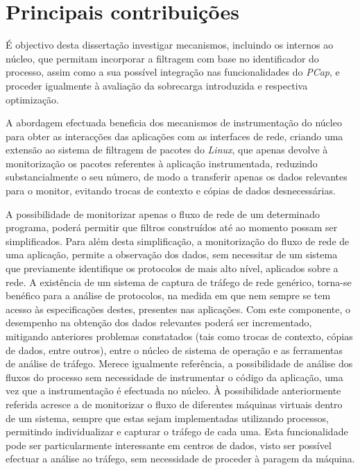 
\section{Principais contribuições} 
\label{sec:intro_contribuicoes}

É objectivo desta dissertação investigar mecanismos, incluindo os internos ao núcleo, que permitam incorporar a filtragem com base no identificador do processo, assim como a sua possível integração nas funcionalidades do \textit{PCap}, e proceder igualmente à avaliação da sobrecarga introduzida e respectiva optimização.

A abordagem efectuada beneficia dos mecanismos de instrumentação do núcleo para obter as interacções das aplicações com as interfaces de rede, criando uma extensão ao sistema de filtragem de pacotes do \textit{Linux}, que apenas devolve à monitorização os pacotes referentes à aplicação instrumentada, reduzindo substancialmente o seu número, de modo a transferir apenas os dados relevantes para o monitor, evitando trocas de contexto e cópias de dados desnecessárias.

A possibilidade de monitorizar apenas o fluxo de rede de um determinado programa, poderá permitir que filtros construídos até ao momento possam ser simplificados.
Para além desta simplificação, a monitorização do fluxo de rede de uma aplicação, permite a observação dos dados, sem necessitar de um sistema que previamente identifique os protocolos de mais alto nível, aplicados sobre a rede.
A existência de um sistema de captura de tráfego de rede genérico, torna-se benéfico para a análise de protocolos, na medida em que nem sempre se tem acesso às especificações destes, presentes nas aplicações.
Com este componente, o desempenho na obtenção dos dados relevantes poderá ser incrementado, mitigando anteriores problemas constatados (tais como trocas de contexto, cópias de dados, entre outros), entre o núcleo de sistema de operação e as ferramentas de análise de tráfego.
Merece igualmente referência, a possibilidade de análise dos fluxos do processo sem necessidade de instrumentar o código da aplicação, uma vez que a instrumentação é efectuada no núcleo.
À possibilidade anteriormente referida acresce a de monitorizar o fluxo de diferentes máquinas virtuais dentro de um sistema, sempre que estas sejam implementadas utilizando processos, permitindo individualizar e capturar o tráfego de cada uma.
Esta funcionalidade pode ser particularmente interessante em centros de dados, visto ser possível efectuar a análise ao tráfego, sem necessidade de proceder à paragem da máquina.

